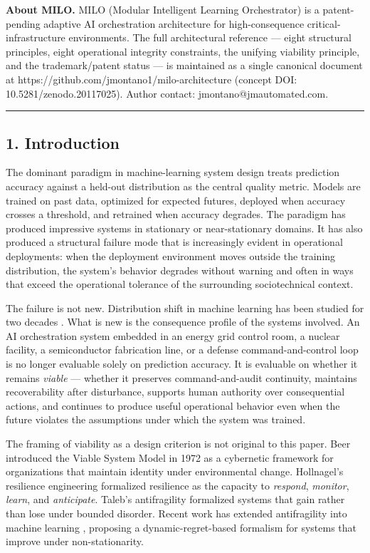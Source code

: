 \textbf{About MILO.} MILO (Modular Intelligent Learning Orchestrator) is
a patent-pending adaptive AI orchestration architecture for
high-consequence critical-infrastructure environments. The full
architectural reference --- eight structural principles, eight
operational integrity constraints, the unifying viability principle, and
the trademark/patent status --- is maintained as a single canonical
document at https://github.com/jmontano1/milo-architecture (concept DOI:
10.5281/zenodo.20117025). Author contact: jmontano@jmautomated.com.

\begin{center}\rule{0.5\linewidth}{0.5pt}\end{center}

\subsection{1. Introduction}\label{introduction}

The dominant paradigm in machine-learning system design treats
prediction accuracy against a held-out distribution as the central
quality metric. Models are trained on past data, optimized for expected
futures, deployed when accuracy crosses a threshold, and retrained when
accuracy degrades. The paradigm has produced impressive systems in
stationary or near-stationary domains. It has also produced a structural
failure mode that is increasingly evident in operational deployments:
when the deployment environment moves outside the training distribution,
the system's behavior degrades without warning and often in ways that
exceed the operational tolerance of the surrounding sociotechnical
context.

The failure is not new. Distribution shift in machine learning has been
studied for two decades \cite{ref6}. What is new is the consequence profile
of the systems involved. An AI orchestration system embedded in an
energy grid control room, a nuclear facility, a semiconductor
fabrication line, or a defense command-and-control loop is no longer
evaluable solely on prediction accuracy. It is evaluable on whether it
remains \emph{viable} --- whether it preserves command-and-audit
continuity, maintains recoverability after disturbance, supports human
authority over consequential actions, and continues to produce useful
operational behavior even when the future violates the assumptions under
which the system was trained.

The framing of viability as a design criterion is not original to this
paper. Beer introduced the Viable System Model in 1972 \cite{ref1} as a
cybernetic framework for organizations that maintain identity under
environmental change. Hollnagel's resilience engineering \cite{ref2}
formalized resilience as the capacity to \emph{respond}, \emph{monitor},
\emph{learn}, and \emph{anticipate}. Taleb's antifragility \cite{ref3}
formalized systems that gain rather than lose under bounded disorder.
Recent work has extended antifragility into machine learning \cite{ref7},
proposing a dynamic-regret-based formalism for systems that improve
under non-stationarity.

